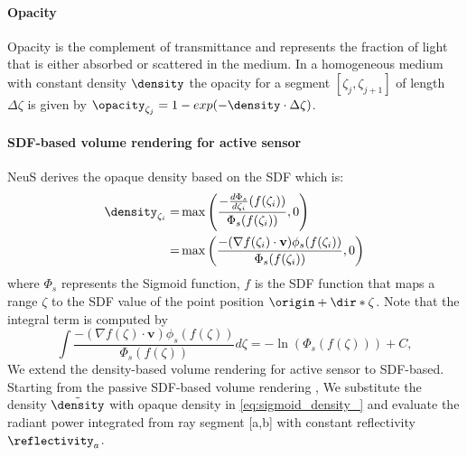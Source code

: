 \paragraph{Opacity}
Opacity is the complement of transmittance and represents the fraction of light that is either absorbed or scattered in the medium. In a homogeneous medium with constant density $\density$  the opacity for a segment $[\zeta_j, \zeta_{j+1}]$ of length $\Delta \zeta$ is given by $\opacity_{\zeta_j} = 1 - exp(-\density \cdot \Delta \zeta)$.

\paragraph{SDF-based volume rendering for active sensor}
NeuS\cite{wang2021neus} derives the opaque density based on the SDF which is:
\begin{equation}
\begin{split}
\density_{\zeta_i} =&  \max\left(\frac{-\frac{d\Phi_s}{d\zeta_i}(f(\zeta_i))}{\Phi_s(f(\zeta_i))},0\right)\\
                  =& \max\left(\frac{-(\nabla f(\zeta_i)\cdot \mathbf{v})\phi_s(f(\zeta_i))}{\Phi_s(f(\zeta_i))}, 0\right)
\end{split}
\label{eq:sigmoid_density_}
\end{equation}
where $\Phi_s$ represents the Sigmoid function, $f$ is the SDF function that maps a range $\zeta$ to the SDF value of the point position $\origin + \dir * \zeta$. Note that the integral term is computed by
\begin{equation}
\int \frac{-(\nabla f(\zeta)\cdot \mathbf{v})\phi_s(f(\zeta))}{\Phi_s(f(\zeta))}d\zeta = -\ln(\Phi_s(f(\zeta))) + C,
\label{eq:intergration_density}
\end{equation}
We extend the density-based volume rendering for active sensor to SDF-based. Starting from the passive SDF-based volume rendering \cite{wang2021neus}, We substitute the density $\tilde{\density}$ with opaque density in \ref{eq:sigmoid_density_}
and evaluate the radiant power integrated from ray segment [a,b] with constant reflectivity $\reflectivity_a$.

